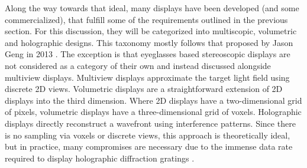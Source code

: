 Along the way towards that ideal, many displays have been developed (and some commercialized), that fulfill some of the requirements outlined in the previous section. For this discussion, they will be categorized into multiscopic, volumetric and holographic designs. This taxonomy mostly follows that proposed by Jason Geng in 2013 \cite{Geng_2013}. The exception is that eyeglasses based stereoscopic displays are not considered as a category of their own and instead discussed alongside multiview displays. Multiview displays approximate the target light field using discrete 2D views. Volumetric displays are a straightforward extension of 2D displays into the third dimension. Where 2D displays have a two-dimensional grid of pixels, volumetric displays have a three-dimensional grid of voxels. Holographic displays directly reconstruct a wavefront using interference patterns. Since there is no sampling via voxels or discrete views, this approach is theoretically ideal, but in practice, many compromises are necessary due to the immense data rate required to display holographic diffraction gratings \cite{Blanche_2021}.